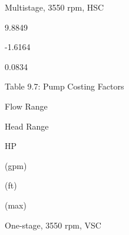 \documentclass[a4paper,portrait,12pt]{article}
\begin{document}
\begin{flushleft}
Multistage, 3550 rpm, HSC
\end{flushleft}





9.8849





-1.6164





0.0834





\begin{flushleft}
Table 9.7: Pump Costing Factors
\end{flushleft}





\begin{flushleft}
Flow Range
\end{flushleft}





\begin{flushleft}
Head Range
\end{flushleft}





\begin{flushleft}
HP
\end{flushleft}





\begin{flushleft}
(gpm)
\end{flushleft}





\begin{flushleft}
(ft)
\end{flushleft}





\begin{flushleft}
(max)
\end{flushleft}





\begin{flushleft}
One-stage, 3550 rpm, VSC
\end{flushleft}
\end{document}
